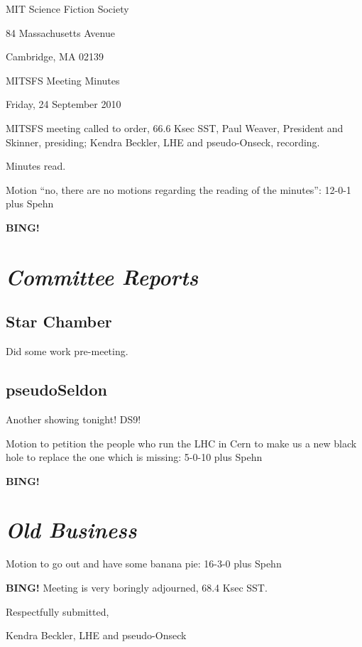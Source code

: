 \documentclass[10pt]{article}
\newcommand{\bing}{{\bf BING!} }
\newcommand{\goto}[1]{\bing \vskip 12pt \section*{{\em{#1}}}}
\newcommand{\ps}{ plus Spehn\xspace}
\newcommand{\skinner}{Paul Weaver, President and Skinner}
\newcommand{\onseck}{Kendra Beckler, LHE and pseudo-Onseck}
\newcommand{\meetingdate}{Friday, 24 September 2010}
\begin{document}
\begin{center}

MIT Science Fiction Society

84 Massachusetts Avenue

Cambridge, MA 02139

\vspace{12pt}

MITSFS Meeting Minutes

\meetingdate

\end{center}

\vspace{18pt}

\setlength{\parskip}{6pt}

\noindent
MITSFS meeting called to order, 66.6 Ksec SST,
\skinner, presiding; \onseck, recording.

Minutes read.

Motion ``no, there are no motions regarding the reading of the minutes'': 12-0-1 \ps

\goto{Committee Reports}

\subsection*{Star Chamber}

Did some work pre-meeting.

\subsection*{pseudoSeldon}

Another showing tonight!  DS9!

Motion to petition the people who run the LHC in Cern to make us a new black hole to replace the one which is missing: 5-0-10 \ps

\goto{Old Business}

Motion to go out and have some banana pie: 16-3-0 \ps

\bing
\noindent
Meeting is very boringly adjourned, 68.4 Ksec SST.

\vspace{18pt}

\centerline{Respectfully submitted,}
\centerline{\onseck}
\end{document}
